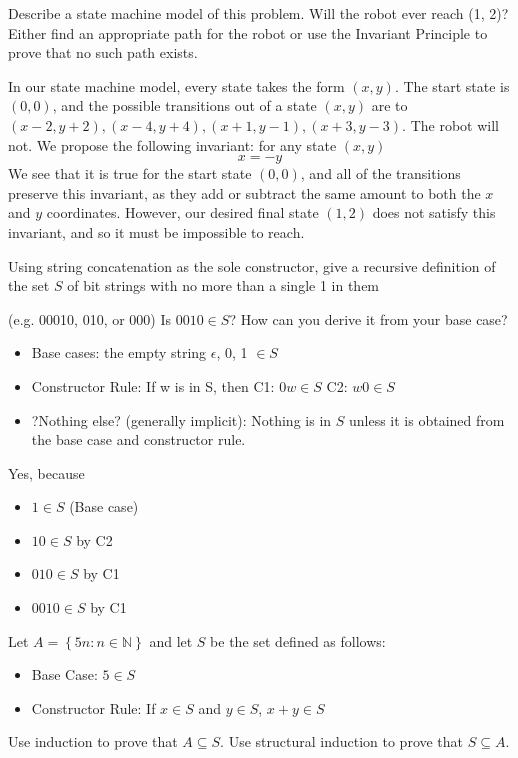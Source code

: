 \documentclass[solution, letterpaper]{cs20}
\begin{document}
\subproblem Describe a state machine model of this problem.
\subproblem Will the robot ever reach (1, 2)? Either find an appropriate path for the robot or use the Invariant Principle to prove that no such path exists.

\begin{solution}
\subsolution In our state machine model, every state takes the form $(x,y)$. The start state is $(0,0)$, and the possible transitions out of a state $(x,y)$ are to $(x-2, y+2),(x-4,y+4),(x+1,y-1),(x+3,y-3)$.
\subsolution The robot will not.
We propose the following invariant: for any state $(x,y)$ 
\[x = -y \]
We see that it is true for the start state $(0,0)$, and all of the transitions preserve this invariant, as they add or subtract the same amount to both the $x$ and $y$ coordinates. However, our desired final state $(1,2)$ does not satisfy this invariant, and so it must be impossible to reach.
\end{solution}

\subproblem Using string concatenation as the sole constructor, give a recursive definition of the set $S$ of bit strings with no more than a single 1 in them 

(e.g. 00010, 010, or 000)
\subproblem Is $0010\in S$? How can you derive it from your base case?

\begin{solution}
\subsolution
\begin{itemize}
\item Base cases: the empty string $\epsilon$, 0, 1 $\in S$
\item Constructor Rule: If w is in S, then
\subitem C1: $0w\in S$
\subitem C2: $w0\in S$
\item ?Nothing else? (generally implicit): Nothing is in $S$ unless it is obtained from the base case and constructor rule.
\end{itemize}
\subsolution Yes, because
\begin{itemize}
\item $1\in S$ (Base case)
\item $10\in S$ by C2 
\item $010\in S$ by C1
\item $0010\in S$ by C1
\end{itemize}
\end{solution}

Let $A = \left\{ {5n:n\in\mathbb{N}}\right\}$ and let $S$ be the set defined as follows:
\begin{itemize}
\item Base Case: $5 \in S$
\item Constructor Rule: If $x\in S$ and $y\in S$, $x+y \in S$ 
\end{itemize}
\subproblem Use induction to prove that $A\subseteq S $.
\subproblem Use structural induction to prove that $S\subseteq A$.
\end{document}
